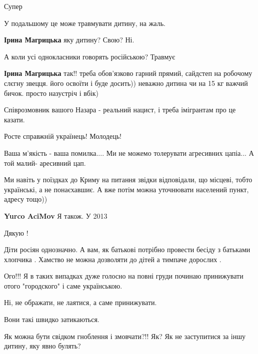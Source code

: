 \begin{itemize}
\begin{itemize}
\end{itemize} %

Супер

У подальшому це може травмувати дитину, на жаль.

\begin{itemize} %
\textbf{Ірина Магрицька} яку дитину?
Свою?
Ні.

А коли усі однокласники говорять російською? Травмує

\textbf{Ірина Магрицька} так!! треба обов'язково гарний прямий, сайдстеп на робочому слєгну звецця. його освоїти і буде досить)) неважно дитина чи на 15 кг важчий бичок. просто назустріч і вбік)
\end{itemize} %

Співрозмовник вашого Назара - реальний нацист, і треба імігрантам про це казати.

Росте справжній українець! Молодець!

Ваша м'якість - ваша помилка....
Ми не можемо толерувати агресивних цапіа...
А той малий- аресивний цап.


Ми навіть у поїздках до Криму на питання звідки відповідали, що місцеві, тобто
українські, а не понаєхавшиє. А вже потім можна уточнювати населений пункт,
адресу тощо))

\begin{itemize} %
\textbf{Yurco AciMov} Я також. У 2013
\end{itemize} %

Дякую !


Діти росіян однозначно. А вам, як батькові потрібно провести бесіду з батьками
хлопчика . Хамство не можна дозволяти до дітей а тимпаче дорослих .



Ого!!! Я в таких випадках дуже голосно на повні груди починаю принижувати отого
"городского" і саме українською.

Ні, не ображати, не лаятися, а саме принижувати.

Вони такі швидко затикаються.

Як можна бути свідком гноблення і змовчати?!! Як? Як не заступитися за іншу
дитину, яку явно булять?


\end{itemize}
